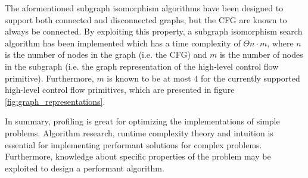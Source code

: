 
The aformentioned subgraph isomorphism algorithms have been designed to support both connected and disconnected graphs, but the CFG are known to always be connected. By exploiting this property, a subgraph isomorphism search algorithm has been implemented which has a time complexity of $ \Theta{n \cdot m} $, where $ n $ is the number of nodes in the graph (i.e. the CFG) and $ m $ is the number of nodes in the subgraph (i.e. the graph representation of the high-level control flow primitive). Furthermore, $ m $ is known to be at most $ 4 $ for the currently supported high-level control flow primitives, which are presented in figure \ref{fig:graph_representations}.

In summary, profiling is great for optimizing the implementations of simple problems. Algorithm research, runtime complexity theory and intuition is essential for implementing performant solutions for complex problems. Furthermore, knowledge about specific properties of the problem may be exploited to design a performant algorithm.




